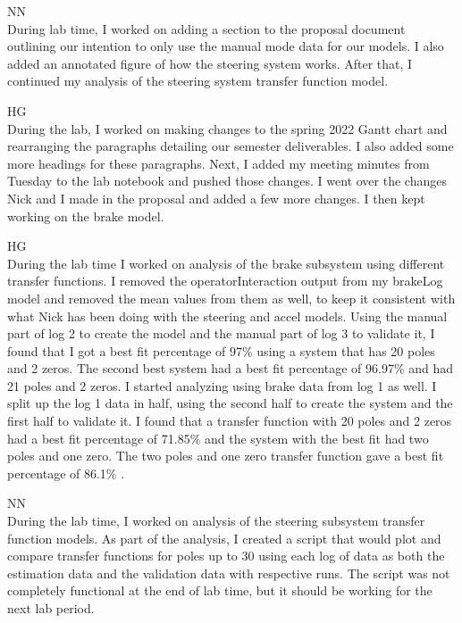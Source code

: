 \documentclass[fontsize=11pt, %
                             paper=letter, %
                             openany, %
                             captions=tableheading,
                             index=totoc,
                             hyperref]{labbook}
\def\currentYear{2021}
\begin{document}
\begin{addmargin}[0cm]{0cm}
\labday{Wednesday, February 2, \currentYear}
NN\\ 
During lab time, I worked on adding a section to the proposal document outlining our intention to only use the manual mode data for our models. I also added an annotated figure of how the steering system works. After that, I continued my analysis of the steering system transfer function model.

HG\\
During the lab, I worked on making changes to the spring 2022 Gantt chart and rearranging the paragraphs detailing our semester deliverables. I also added some more headings for these paragraphs. Next, I added my meeting minutes from Tuesday to the lab notebook and pushed those changes. I went over the changes Nick and I made in the proposal and added a few more changes. I then kept working on the brake model. 

\labday{Monday, February 7, \currentYear}
HG\\ 
During the lab time I worked on analysis of the brake subsystem using different transfer functions. I removed the operatorInteraction output from my brakeLog model and removed the mean values from them as well, to keep it consistent with what Nick has been doing with the steering and accel models. Using the manual part of log 2 to create the model and the manual part of log 3 to validate it, I found that I got a best fit percentage of 97\%
using a system that has 20 poles and 2 zeros. The second best system had a best fit percentage of 96.97\%
and had 21 poles and 2 zeros. I started analyzing using brake data from log 1 as well. I split up the log 1 data in half, using the second half to create the system and the first half to validate it. I found that a transfer function with 20 poles and 2 zeros had a best fit percentage of 71.85\% 
and the system with the best fit had two poles and one zero. The two poles and one zero transfer function gave a best fit percentage of 86.1\%
. 

NN\\

During the lab time, I worked on analysis of the steering subsystem transfer function models. As part of the analysis, I created a script that would  plot and compare transfer functions for poles up to 30 using each log of data as both the estimation data and the validation data with respective runs. The script was not completely functional at the end of lab time, but it should be working for the next lab period.



\end{addmargin}
\end{document}
